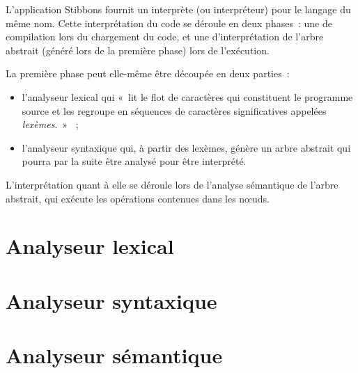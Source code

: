 L'application Stibbons fournit un interprète (ou interpréteur) pour le langage du même nom. Cette interprétation du code se déroule en deux phases~: une de compilation lors du chargement du code, et une d'interprétation de l'arbre abstrait (généré lors de la première phase) lors de l'exécution.

La première phase peut elle-même être découpée en deux parties~:
\begin{itemize}
\item l'analyseur lexical qui «~lit le flot de caractères qui constituent le programme source et les regroupe en séquences de caractères significatives appelées \emph{lexèmes}.~» \cite{compilateurs}~;
\item l'analyseur syntaxique qui, à partir des lexèmes, génère un arbre abstrait qui pourra par la suite être analysé pour être interprété.
\end{itemize}

L'interprétation quant à elle se déroule lors de l'analyse sémantique de l'arbre abstrait, qui exécute les opérations contenues dans les nœuds.

\section{Analyseur lexical}
\label{analyse-lexicale}


\section{Analyseur syntaxique}
\label{analyse-syntaxique}


\section{Analyseur sémantique}
\label{Analyseur sémantique}

